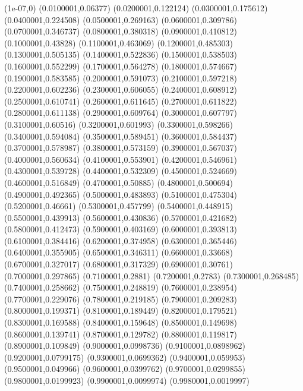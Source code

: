 \expandafter\def\csname heapTam@W_5\endcsname{(1e-07,0) (0.0100001,0.06377) (0.0200001,0.122124) (0.0300001,0.175612) (0.0400001,0.224508) (0.0500001,0.269163) (0.0600001,0.309786) (0.0700001,0.346737) (0.0800001,0.380318) (0.0900001,0.410812) (0.1000001,0.43828) (0.1100001,0.463069) (0.1200001,0.485303) (0.1300001,0.505135) (0.1400001,0.522836) (0.1500001,0.538503) (0.1600001,0.552299) (0.1700001,0.564278) (0.1800001,0.574667) (0.1900001,0.583585) (0.2000001,0.591073) (0.2100001,0.597218) (0.2200001,0.602236) (0.2300001,0.606055) (0.2400001,0.608912) (0.2500001,0.610741) (0.2600001,0.611645) (0.2700001,0.611822) (0.2800001,0.611138) (0.2900001,0.609764) (0.3000001,0.607797) (0.3100001,0.60516) (0.3200001,0.601993) (0.3300001,0.598266) (0.3400001,0.594084) (0.3500001,0.589451) (0.3600001,0.584437) (0.3700001,0.578987) (0.3800001,0.573159) (0.3900001,0.567037) (0.4000001,0.560634) (0.4100001,0.553901) (0.4200001,0.546961) (0.4300001,0.539728) (0.4400001,0.532309) (0.4500001,0.524669) (0.4600001,0.516849) (0.4700001,0.50885) (0.4800001,0.500694) (0.4900001,0.492365) (0.5000001,0.483893) (0.5100001,0.475304) (0.5200001,0.46661) (0.5300001,0.457799) (0.5400001,0.448915) (0.5500001,0.439913) (0.5600001,0.430836) (0.5700001,0.421682) (0.5800001,0.412473) (0.5900001,0.403169) (0.6000001,0.393813) (0.6100001,0.384416) (0.6200001,0.374958) (0.6300001,0.365446) (0.6400001,0.355905) (0.6500001,0.346311) (0.6600001,0.33668) (0.6700001,0.327017) (0.6800001,0.317329) (0.6900001,0.30761) (0.7000001,0.297865) (0.7100001,0.2881) (0.7200001,0.2783) (0.7300001,0.268485) (0.7400001,0.258662) (0.7500001,0.248819) (0.7600001,0.238954) (0.7700001,0.229076) (0.7800001,0.219185) (0.7900001,0.209283) (0.8000001,0.199371) (0.8100001,0.189449) (0.8200001,0.179521) (0.8300001,0.169588) (0.8400001,0.159648) (0.8500001,0.149698) (0.8600001,0.139741) (0.8700001,0.129782) (0.8800001,0.119817) (0.8900001,0.109849) (0.9000001,0.0998736) (0.9100001,0.0898962) (0.9200001,0.0799175) (0.9300001,0.0699362) (0.9400001,0.059953) (0.9500001,0.049966) (0.9600001,0.0399762) (0.9700001,0.0299855) (0.9800001,0.0199923) (0.9900001,0.0099974) (0.9980001,0.0019997)}
